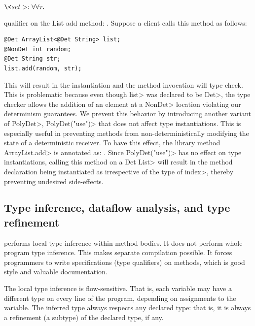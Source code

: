 $\<set> : \forall \forallt{\tau}$

qualifier 
on the List add method: .
Suppose a client calls this method as follows:
\begin{verbatim}
@Det ArrayList<@Det String> list;
@NonDet int random;
@Det String str;
list.add(random, str);
\end{verbatim}
This will result in the instantiation  and
the method invocation will type check. This is problematic because even though \<list> was declared to be \<Det>,
the type checker allows the addition of an element at a \<NonDet> location violating our determinism guarantees.
We prevent this behavior by introducing another variant of \<PolyDet>, \<PolyDet("use")> that does not affect
type instantiations. This is especially useful in preventing methods from non-deterministically modifying the state
of a deterministic receiver. To have this effect, the library method \<ArrayList.add> is annotated as:
.
Since \<PolyDet("use")> has no effect on type instantiations, calling this method on a \<Det List>
will result in the method declaration being instantiated as 
irrespective of the type of \<index>, thereby preventing undesired side-effects.


\subsection{Type inference, dataflow analysis, and type refinement}\label{dataflow}



\TheDeterminismChecker performs local type inference within method bodies.
It does not perform whole-program type inference.
This makes separate compilation possible.
It forces programmers to write specifications (type qualifiers) on methods,
which is good style and valuable documentation.

The local type inference is flow-sensitive.  That is, each variable may
have a different type on every line of the program, depending on
assignments to the variable.  The inferred type always respects any
declared type:  that is, it is always a refinement (a subtype) of the
declared type, if any.


